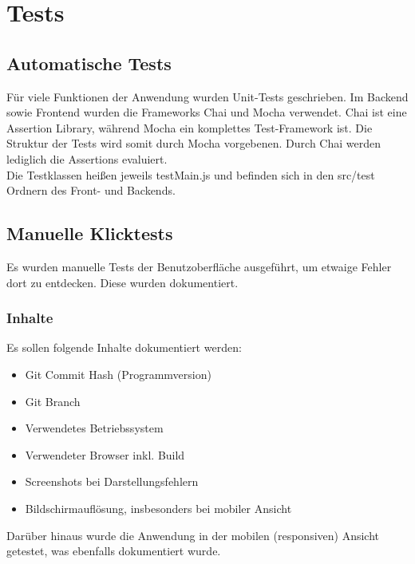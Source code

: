 \section{Tests}\label{Tests}
\subsection{Automatische Tests}
Für viele Funktionen der Anwendung wurden Unit-Tests geschrieben.
Im Backend sowie Frontend wurden die Frameworks Chai und Mocha verwendet.
Chai ist eine Assertion Library, während Mocha ein komplettes Test-Framework ist.
Die Struktur der Tests wird somit durch Mocha vorgebenen.
Durch Chai werden lediglich die Assertions evaluiert.
\\
Die Testklassen heißen jeweils testMain.js und befinden sich in den src/test Ordnern des Front- und Backends.

\subsection{Manuelle Klicktests}
Es wurden manuelle Tests der Benutzoberfläche ausgeführt, um etwaige Fehler dort zu entdecken.
Diese wurden dokumentiert.
\subsubsection{Inhalte}
Es sollen folgende Inhalte dokumentiert werden:
\begin{itemize}
    \item Git Commit Hash (Programmversion)
    \item Git Branch
    \item Verwendetes Betriebssystem
    \item Verwendeter Browser inkl. Build
    \item Screenshots bei Darstellungsfehlern
    \item Bildschirmauflösung, insbesonders bei mobiler Ansicht
\end{itemize}
Darüber hinaus wurde die Anwendung in der mobilen (responsiven) Ansicht getestet, was ebenfalls dokumentiert wurde.

